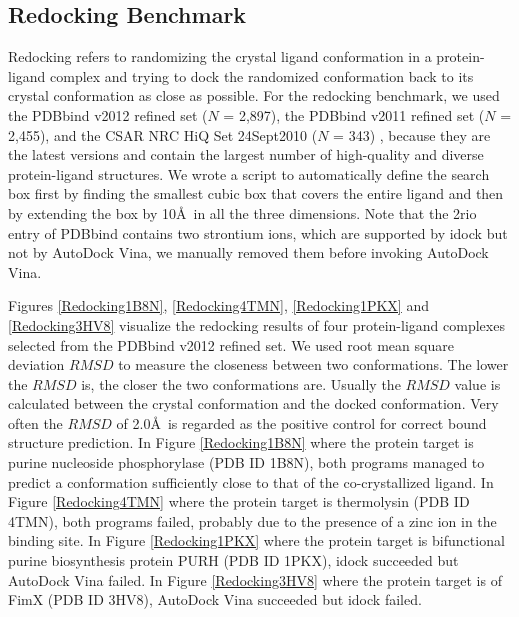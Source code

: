 \documentclass[10pt]{article}
\begin{document}
\subsection*{Redocking Benchmark}
Redocking refers to randomizing the crystal ligand conformation in a protein-ligand complex and trying to dock the randomized conformation back to its crystal conformation as close as possible. For the redocking benchmark, we used the PDBbind v2012 \cite{529,530} refined set ($N$ = 2,897), the PDBbind v2011 refined set ($N$ = 2,455), and the CSAR NRC HiQ Set 24Sept2010 ($N$ = 343) \cite{857,960}, because they are the latest versions and contain the largest number of high-quality and diverse protein-ligand structures. We wrote a script to automatically define the search box first by finding the smallest cubic box that covers the entire ligand and then by extending the box by 10\AA\ in all the three dimensions. Note that the 2rio entry of PDBbind contains two strontium ions, which are supported by idock but not by AutoDock Vina, we manually removed them before invoking AutoDock Vina.

Figures \ref{Redocking1B8N}, \ref{Redocking4TMN}, \ref{Redocking1PKX} and \ref{Redocking3HV8} visualize the redocking results of four protein-ligand complexes selected from the PDBbind v2012 refined set. We used root mean square deviation $RMSD$ to measure the closeness between two conformations. The lower the $RMSD$ is, the closer the two conformations are. Usually the $RMSD$ value is calculated between the crystal conformation and the docked conformation. Very often the $RMSD$ of 2.0\AA\ is regarded as the positive control for correct bound structure prediction. In Figure \ref{Redocking1B8N} where the protein target is purine nucleoside phosphorylase (PDB ID 1B8N), both programs managed to predict a conformation sufficiently close to that of the co-crystallized ligand. In Figure \ref{Redocking4TMN} where the protein target is thermolysin (PDB ID 4TMN), both programs failed, probably due to the presence of a zinc ion in the binding site. In Figure \ref{Redocking1PKX} where the protein target is bifunctional purine biosynthesis protein PURH (PDB ID 1PKX), idock succeeded but AutoDock Vina failed. In Figure \ref{Redocking3HV8} where the protein target is of FimX (PDB ID 3HV8), AutoDock Vina succeeded but idock failed.
\end{document}
